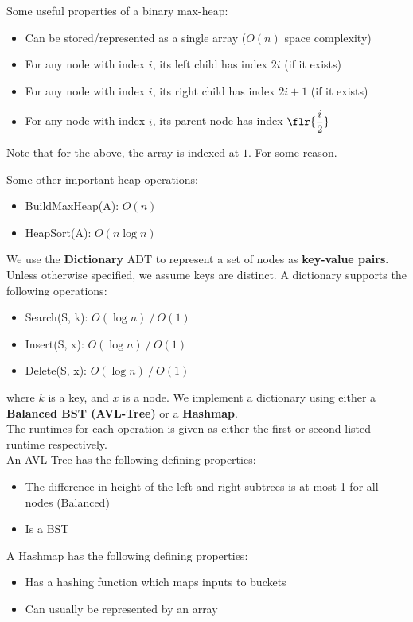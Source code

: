 \documentclass{article}
\begin{document}
\begin{crll}
Some useful properties of a binary max-heap:
\begin{itemize}
    \item Can be stored/represented as a single array ($ O(n) $ space complexity)
    \item For any node with index $ i $, its left child has index $ 2i $ (if it exists)
    \item For any node with index $ i $, its right child has index $ 2i + 1 $ (if it exists)
    \item For any node with index $ i $, its parent node has index $ \flr{ \dfrac{i}{2}} $
\end{itemize}
Note that for the above, the array is indexed at $ 1 $. For some reason.
\end{crll}

\begin{lm}
Some other important heap operations:
\begin{itemize}
    \item BuildMaxHeap(A): $ O(n) $
    \item HeapSort(A): $ O(n \log n) $
\end{itemize}
\end{lm}

\begin{defn}
We use the \textbf{Dictionary} ADT to represent a set of nodes as \textbf{key-value pairs}. Unless otherwise specified, we assume keys are distinct. \vsp
A dictionary supports the following operations:
\begin{itemize}
    \item Search(S, k): $ O(\log n) \ / \ O(1) $
    \item Insert(S, x): $ O(\log n) \ / \ O(1) $
    \item Delete(S, x): $ O(\log n) \ / \ O(1) $
\end{itemize}
where $ k $ is a key, and $ x $ is a node. \vsp
We implement a dictionary using either a \textbf{Balanced BST (AVL-Tree)} or a \textbf{Hashmap}. \\
The runtimes for each operation is given as either the first or second listed runtime respectively. \\
An AVL-Tree has the following defining properties:
\begin{itemize}
    \item The difference in height of the left and right subtrees is at most 1 for all nodes (Balanced)
    \item Is a BST
\end{itemize}
A Hashmap has the following defining properties:
\begin{itemize}
    \item Has a hashing function which maps inputs to buckets
    \item Can usually be represented by an array
\end{itemize}
\end{defn}
\end{document}
